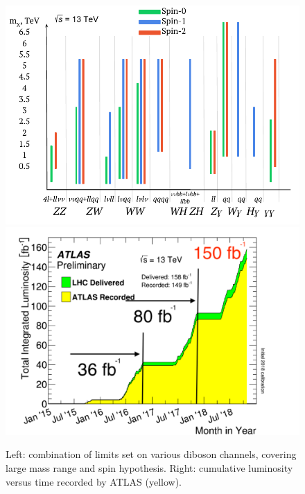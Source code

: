 \documentclass{PoS}
\begin{document}
  \begin{figure}
     \includegraphics[width=.5\textwidth]{figures/lim_sketch}
     \includegraphics[width=.5\textwidth]{figures/intlumivstimeRun2}
     \caption{Left: combination of limits set on various diboson channels, covering large mass range and spin hypothesis. Right: cumulative luminosity versus time recorded by ATLAS (yellow).}
     \label{fig:summary}
     \end{figure}







%
\end{document}
